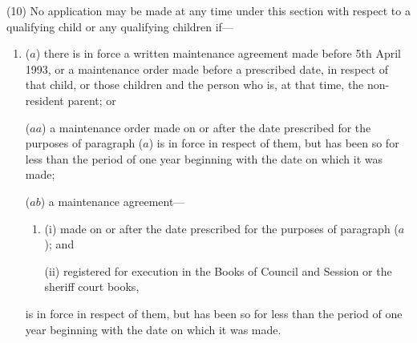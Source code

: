 \documentclass[12pt,a4paper]{article}
\begin{document}
(10) No
application may be made at any time under this section with respect
to a qualifying child or any qualifying children if---
\begin{enumerate}\item[]
($a$)
there is in force a written maintenance agreement made before 5th April
1993, or a maintenance order 
made before a prescribed date, in respect
of that child, or those children and the person who is, at that time, the non-resident parent; or

($aa$) a
maintenance order made on or after the date prescribed for the purposes
of paragraph ($a$) is in force in respect of them, but has been so for less than
the period of one year beginning with the date on which it was made;

($ab$) a
maintenance agreement---
\begin{enumerate}\item[]
(i)
made on or after the date prescribed for the purposes of paragraph ($a$);
and

(ii)
registered for execution in the Books of Council and Session or the
sheriff court books,
\end{enumerate}
is in force in respect of them, but has been so for less than the period of one year
beginning with the date on which it was made.
\end{enumerate}
\end{document}
